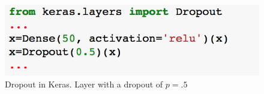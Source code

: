 \documentclass[xcolor=pdftex,dvipsnames,table,mathserif]{beamer}
\begin{document}
\begin{frame}
\begin{figure}
\includegraphics[width=.99 \columnwidth]{../graphics/DropoutKeras}
\caption{Dropout in Keras. Layer with a dropout of $p=.5$}
\end{figure}
\end{frame}
	


\end{document}
